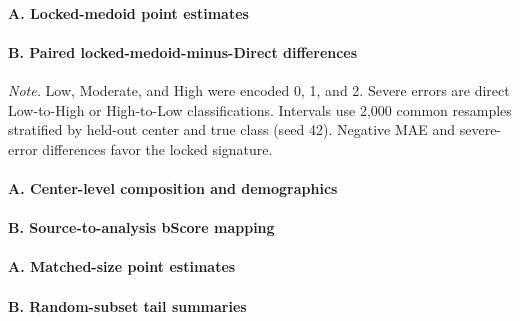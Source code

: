 

\paragraph*{A. Locked-medoid point estimates}



\paragraph*{B. Paired locked-medoid-minus-Direct differences}



{\footnotesize\noindent\textit{Note.} Low, Moderate, and High were encoded 0, 1, and 2. Severe errors are direct Low-to-High or High-to-Low classifications. Intervals use 2,000 common resamples stratified by held-out center and true class (seed 42). Negative MAE and severe-error differences favor the locked signature.\par}

\paragraph*{A. Center-level composition and demographics}



\paragraph*{B. Source-to-analysis bScore mapping}











\paragraph*{A. Matched-size point estimates}



\paragraph*{B. Random-subset tail summaries}

